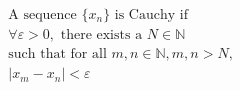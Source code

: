 \documentclass[preview]{standalone}
\begin{document}
\begin{align*}
\begin{aligned}&\text{A sequence } \{x_n\} \text{ is Cauchy if } \\ &\forall \varepsilon > 0, \text{ there exists a } N \in \mathbb{N} \\ &\text{such that for all } m, n \in \mathbb{N}, m, n > N, \\ &|x_m - x_n| < \varepsilon\end{aligned}
\end{align*}
\end{document}
